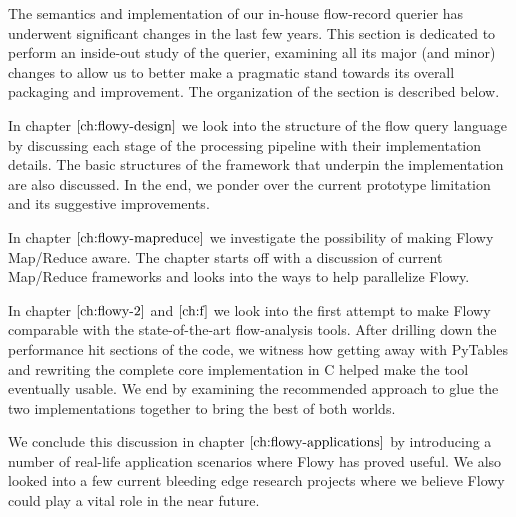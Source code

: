 The semantics and implementation of our in-house flow-record querier has underwent significant changes in the last few years. This section is dedicated to perform an inside-out study of the querier, examining all its major (and minor) changes to allow us to better make a pragmatic stand towards its overall packaging and improvement. The organization of the section is described below.

\vspace{50pt}

In chapter $\ref{ch:flowy-design}$ we look into the structure of the flow query language by discussing each stage of the processing pipeline with their implementation details. The basic structures of the framework that underpin the implementation are also discussed. In the end, we ponder over the current prototype limitation and its suggestive improvements.

In chapter $\ref{ch:flowy-mapreduce}$ we investigate the possibility of making Flowy Map/Reduce aware. The chapter starts off with a discussion of current Map/Reduce frameworks and looks into the ways to help parallelize Flowy.

In chapter $\ref{ch:flowy-2}$ and $\ref{ch:f}$ we look into the first attempt to make Flowy comparable with the state-of-the-art flow-analysis tools. After drilling down the performance hit sections of the code, we witness how getting away with PyTables and rewriting the complete core implementation in C helped make the tool eventually usable. We end by examining the recommended approach to glue the two implementations together to bring the best of both worlds.

We conclude this discussion in chapter $\ref{ch:flowy-applications}$ by introducing a number of real-life application scenarios where Flowy has proved useful. We also looked into a few current bleeding edge research projects where we believe Flowy could play a vital role in the near future.